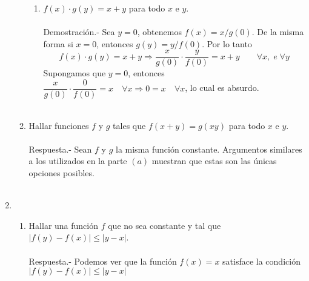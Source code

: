 \begin{enumerate}
\begin{enumerate}[\bfseries (a)]
\begin{enumerate}[\bfseries (i)]
		\item $f(x) \cdot g(y) = x+y$ para todo $x$ e $y$.\\\\
		    Demostración.-\; Sea $y=0$, obtenemos $f(x)=x/g(0)$. De la misma forma si $x=0$, entonces $g(y)=y/f(0)$. Por lo tanto $$  f(x) \cdot g(y) = x+y \Longrightarrow \dfrac{x}{g(0)}\cdot \dfrac{y}{f(0)}=x+y \qquad \forall x, \; e \; \forall y$$ Supongamos que $y=0$, entonces $\dfrac{x}{g(0)}\cdot \dfrac{0}{f(0)}=x \quad \forall x \Longrightarrow 0=x \quad \forall x$, lo cual es absurdo.\\\\

	    \end{enumerate}

	    \item Hallar funciones $f$ y $g$ tales que $f(x+y) = g(xy)$ para todo $x$ e $y$. \\\\
		Respuesta.-\; Sean $f$ y $g$ la misma función constante. Argumentos similares a los utilizados en la parte $(a)$ muestran que estas son las únicas opciones posibles. \\\\ 

	\end{enumerate}

	\item 
	\begin{enumerate}[\bfseries (a)]

	    \item Hallar una función $f$ que no sea constante y tal que $|f(y) - f(x)| \leq |y-x|$.\\\\
		Respuesta.-\; Podemos ver que la función $f(x)=x$ satisface la condición $|f(y) - f(x)| \leq |y-x|$\\\\


\end{enumerate}
\end{enumerate}
